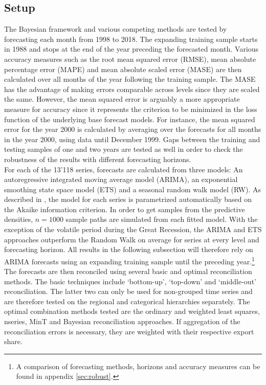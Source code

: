\documentclass[a4paper,fleqn,11pt]{article}
\begin{document}
\subsection{Setup}
The Bayesian framework and various competing methods are tested by forecasting each month from 1998 to 2018. The expanding training sample starts in 1988 and stops at the end of the year preceding the forecasted month. Various accuracy measures such as the root mean squared error (RMSE), mean absolute percentage error (MAPE) and mean absolute scaled error (MASE) are then calculated over all months of the year following the training sample. The MASE has the advantage of making errors comparable across levels since they are scaled the same. However, the mean squared error is arguably a more appropriate measure for accuracy since it represents the criterion to be minimized in the loss function of the underlying base forecast models. For instance, the mean squared error for the year 2000 is calculated by averaging over the forecasts for all months in the year 2000, using data until December 1999. Gaps between the training and testing samples of one and two years are tested as well in order to check the robustness of the results with different forecasting horizons.\\

For each of the 13'118 series, forecasts are calculated from three models: An autoregressive integrated moving average model (ARIMA), an exponential smoothing state space model (ETS) and a seasonal random walk model (RW). As described in \cite{Hyndman2008}, the model for each series is parametrized automatically based on the Akaike information criterion. In order to get samples from the predictive densities, $n = 1000$ sample paths are simulated from each fitted model. With the exception of the volatile period during the Great Recession, the ARIMA and ETS approaches outperform the Random Walk on average for series at every level and forecasting horizon. All results in the following subsection will therefore rely on ARIMA forecasts using an expanding training sample until the preceding year.\footnote{A comparison of forecasting methods, horizons and accuracy measures can be found in appendix \ref{sec:robust}.}\\

The forecasts are then reconciled using several basic and optimal reconciliation methods. The basic techniques include `bottom-up', `top-down' and `middle-out' reconciliation. The latter two can only be used for non-grouped time series and are therefore tested on the regional and categorical hierarchies separately. The optimal combination methods tested are the ordinary and weighted least squares, nseries, MinT and Bayesian reconciliation approaches. If aggregation of the reconciliation errors is necessary, they are weighted with their respective export share.\\
\end{document}
